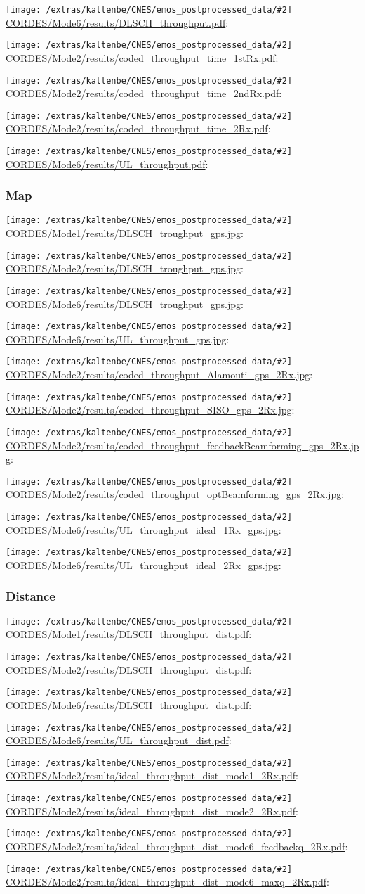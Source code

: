 \documentclass[a4paper,10pt]{article}
\newcommand{\printfile}[2][]{
 \begin{minipage}{8cm}
  \centering
  \texttt{[image: /extras/kaltenbe/CNES/emos\_postprocessed\_data/\#2]}
  \url{#2}: #1

 \end{minipage}
}
\begin{document}
\printfile{CORDES/Mode6/results/DLSCH_throughput.pdf}
\printfile{CORDES/Mode2/results/coded_throughput_time_1stRx.pdf}

\printfile{CORDES/Mode2/results/coded_throughput_time_2ndRx.pdf}
\printfile{CORDES/Mode2/results/coded_throughput_time_2Rx.pdf}

\printfile{CORDES/Mode6/results/UL_throughput.pdf}


\subsubsection{Map}

\printfile{CORDES/Mode1/results/DLSCH_troughput_gps.jpg}
\printfile{CORDES/Mode2/results/DLSCH_troughput_gps.jpg}

\printfile{CORDES/Mode6/results/DLSCH_troughput_gps.jpg}
\printfile{CORDES/Mode6/results/UL_throughput_gps.jpg}

\printfile{CORDES/Mode2/results/coded_throughput_Alamouti_gps_2Rx.jpg}
\printfile{CORDES/Mode2/results/coded_throughput_SISO_gps_2Rx.jpg}

\printfile{CORDES/Mode2/results/coded_throughput_feedbackBeamforming_gps_2Rx.jpg}
\printfile{CORDES/Mode2/results/coded_throughput_optBeamforming_gps_2Rx.jpg}

\printfile{CORDES/Mode6/results/UL_throughput_ideal_1Rx_gps.jpg}
\printfile{CORDES/Mode6/results/UL_throughput_ideal_2Rx_gps.jpg}

\subsubsection{Distance}

\printfile{CORDES/Mode1/results/DLSCH_throughput_dist.pdf}
\printfile{CORDES/Mode2/results/DLSCH_throughput_dist.pdf}

\printfile{CORDES/Mode6/results/DLSCH_throughput_dist.pdf}
\printfile{CORDES/Mode6/results/UL_throughput_dist.pdf}


\printfile{CORDES/Mode2/results/ideal_throughput_dist_mode1_2Rx.pdf}
%
\printfile{CORDES/Mode2/results/ideal_throughput_dist_mode2_2Rx.pdf}

\printfile{CORDES/Mode2/results/ideal_throughput_dist_mode6_feedbackq_2Rx.pdf}
%
\printfile{CORDES/Mode2/results/ideal_throughput_dist_mode6_maxq_2Rx.pdf}
\end{document}
